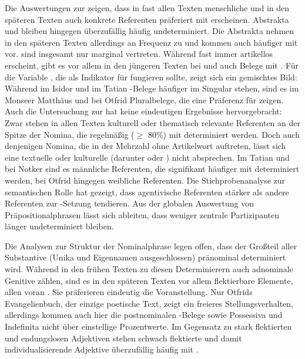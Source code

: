 Die Auswertungen zur  zeigen, dass in fast allen Texten menschliche und in den späteren Texten auch konkrete Referenten präferiert mit  erscheinen. Abstrakta  und  bleiben hingegen überzufällig häufig undeterminiert. Die Abstrakta  nehmen in den späteren Texten allerdings an Frequenz zu und kommen auch häufiger mit  vor.  sind insgesamt nur marginal vertreten. Während   fast immer artikellos erscheint, gibt es vor allem in den jüngeren Texten bei  und  auch Belege mit . Für die Variable , die als Indikator für  fungieren sollte, zeigt sich ein gemischtes Bild:  Während im Isidor und im Tatian -Belege häufiger im Singular stehen, sind es im Monseer Matthäus und bei Otfrid Pluralbelege, die eine Präferenz für  zeigen. Auch die Untersuchung zur  hat keine eindeutigen Ergebnisse hervorgebracht: Zwar stehen in allen Texten kulturell oder thematisch relevante  Referenten an der Spitze der Nomina, die regelmäßig ($\geq$ 80\%) mit  determiniert werden. Doch auch denjenigen Nomina, die in der Mehrzahl ohne Artikelwort auftreten, lässt sich eine textuelle oder kulturelle  (darunter  oder ) nicht absprechen. Im Tatian und bei Notker sind es männliche Referenten, die signifikant häufiger mit  determiniert werden, bei Otfrid hingegen weibliche Referenten. Die Stichprobenanalyse zur semantischen Rolle  hat gezeigt, dass agentivische Referenten stärker als andere Referenten zur -Setzung tendieren. Aus der globalen Auswertung von Präpositionalphrasen  lässt sich ableiten, dass weniger zentrale Partizipanten länger undeterminiert bleiben. 

Die Analysen zur Struktur der Nominalphrase legen offen, dass der Großteil aller Substantive  (Unika  und Eigennamen  ausgeschlossen) pränominal determiniert wird. Während in den frühen Texten zu diesen Determinierern  auch adnominale Genitive  zählen, sind es in den späteren Texten vor allem flektierbare  Elemente, allen voran . Sie präferieren eindeutig die Voranstellung. Nur Otfrids Evangelienbuch, der einzige poetische Text, zeigt ein freieres Stellungsverhalten, allerdings kommen auch hier die postnominalen -Belege sowie Possessiva  und Indefinita  nicht über einstellige Prozentwerte. Im Gegensatz zu stark flektierten  und endungslosen Adjektiven  stehen schwach flektierte  und damit individualisierende Adjektive überzufällig häufig mit .
